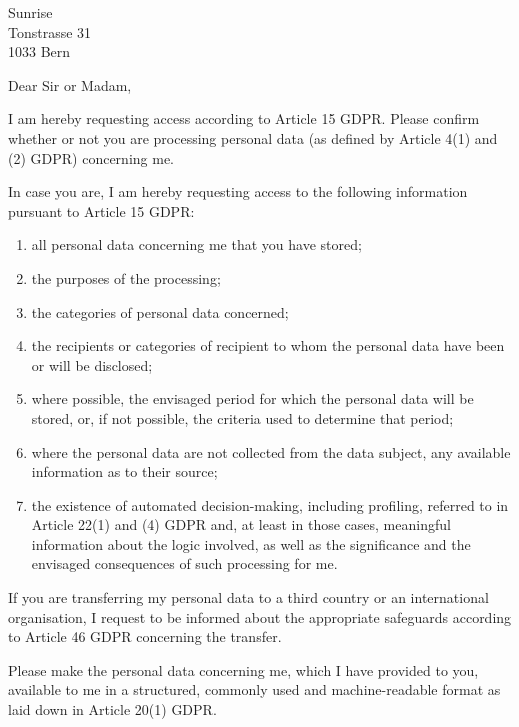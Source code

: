 \documentclass[11pt, a4paper]{letter} %
\begin{document}

\begin{letter}{
	Sunrise\\
	Tonstrasse 31 \\
    1033 Bern
}


    \opening{Dear Sir or Madam,}

I am hereby requesting access according to Article 15 GDPR. Please confirm whether or not you are processing personal data (as defined by Article 4(1) and (2) GDPR) concerning me.

In case you are, I am hereby requesting access to the following information pursuant to Article 15 GDPR:
\begin{enumerate}
\itemsep0em 
\item all personal data concerning me that you have stored;
\item the purposes of the processing;
\item the categories of personal data concerned;
\item the recipients or categories of recipient to whom the personal data have been or will be disclosed;
\item where possible, the envisaged period for which the personal data will be stored, or, if not possible, the criteria used to determine that period;
\item where the personal data are not collected from the data subject, any available information as to their source;
\item the existence of automated decision-making, including profiling, referred to in Article 22(1) and (4) GDPR and, at least in those cases, meaningful information about the logic involved, as well as the significance and the envisaged consequences of such processing for me.
\end{enumerate}

If you are transferring my personal data to a third country or an international organisation, I request to be informed about the appropriate safeguards according to Article 46 GDPR concerning the transfer.

Please make the personal data concerning me, which I have provided to you, available to me in a structured, commonly used and machine-readable format as laid down in Article 20(1) GDPR.


\end{letter}
\end{document}
